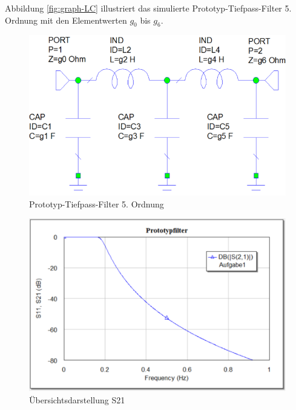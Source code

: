 Abbildung      \ref{fig:graph-LC}       illustriert       das       simulierte
Prototyp-Tiefpass-Filter  5.  Ordnung mit den Elementwerten $g_0$  bis  $g_6$.

\begin{figure}
    \centering
 	\includegraphics[width=\imagewidth]{images/Topologie_Prototyp.png}
 	\caption{Prototyp-Tiefpass-Filter 5. Ordnung}
 	\label{fig:Topologie_Prototyp.png}
\end{figure}

\begin{figure}
    \centering
 	\includegraphics[width=\imagewidth]{images/Ovw_Prototyp.png}
 	\caption{Übersichtsdarstellung S21}
 	\label{fig:Ovw_Prototyp}
\end{figure}

